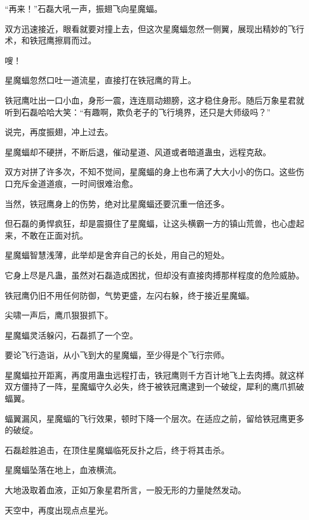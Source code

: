 \begin{this_body}
“再来！”石磊大吼一声，振翅飞向星魔蝠。

双方迅速接近，眼看就要对撞上去，但这次星魔蝠忽然一侧翼，展现出精妙的飞行术，和铁冠鹰擦肩而过。

嗖！

星魔蝠忽然口吐一道流星，直接打在铁冠鹰的背上。

铁冠鹰吐出一口小血，身形一震，连连扇动翅膀，这才稳住身形。随后万象星君就听到石磊哈哈大笑：“有趣啊，欺负老子的飞行境界，还只是大师级吗？”

说完，再度振翅，冲上过去。

星魔蝠却不硬拼，不断后退，催动星道、风道或者暗道蛊虫，远程克敌。

双方对拼了许多次，不知不觉间，星魔蝠的身上也布满了大大小小的伤口。这些伤口充斥金道道痕，一时间很难治愈。

当然，铁冠鹰身上的伤势，绝对比星魔蝠还要沉重一倍还多。

但石磊的勇悍疯狂，却是震摄住了星魔蝠，让这头横霸一方的镇山荒兽，也心虚起来，不敢在正面对抗。

星魔蝠智慧浅薄，此举却是舍弃自己的长处，用自己的短处。

它身上尽是凡蛊，虽然对石磊造成困扰，但却没有直接肉搏那样程度的危险威胁。

铁冠鹰仍旧不用任何防御，气势更盛，左闪右躲，终于接近星魔蝠。

尖啸一声后，鹰爪狠狠抓下。

星魔蝠灵活躲闪，石磊抓了一个空。

要论飞行造诣，从小飞到大的星魔蝠，至少得是个飞行宗师。

星魔蝠拉开距离，再度用蛊虫远程打击，铁冠鹰则千方百计地飞上去肉搏。就这样双方僵持了一阵，星魔蝠守久必失，终于被铁冠鹰逮到一个破绽，犀利的鹰爪抓破蝠翼。

蝠翼漏风，星魔蝠的飞行效果，顿时下降一个层次。在适应之前，留给铁冠鹰更多的破绽。

石磊趁胜追击，在顶住星魔蝠临死反扑之后，终于将其击杀。

星魔蝠坠落在地上，血液横流。

大地汲取着血液，正如万象星君所言，一股无形的力量陡然发动。

天空中，再度出现点点星光。

\end{this_body}


